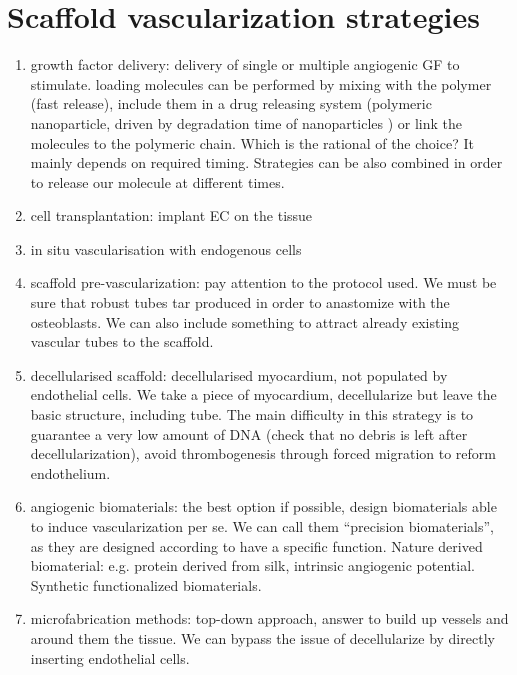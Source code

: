 \section{Scaffold vascularization strategies}
\begin{enumerate}
\item growth factor delivery: delivery of single or multiple angiogenic GF to stimulate. loading molecules can be performed by mixing with the polymer (fast release), include them in a drug releasing system (polymeric nanoparticle, driven by degradation time of nanoparticles ) or link the molecules to the polymeric chain. Which is the rational of the choice? It mainly depends on required timing. Strategies can be also combined in order to release our molecule at different times.
\item cell transplantation: implant EC on the tissue
\item in situ vascularisation with endogenous cells
\item scaffold pre-vascularization: pay attention to the protocol used. We must be sure that robust tubes tar produced in order to anastomize with the osteoblasts. We can also include something to attract already existing vascular tubes to the scaffold.
\item decellularised scaffold: decellularised myocardium, not populated by endothelial cells. We take a piece of myocardium, decellularize but leave the basic structure, including tube. The main difficulty in this strategy is to guarantee a very low amount of DNA (check that no debris is left after decellularization), avoid thrombogenesis through forced migration to reform endothelium.
\item angiogenic biomaterials: the best option if possible, design biomaterials able to induce vascularization per se. We can call them “precision biomaterials”, as they are designed according to have a specific function. Nature derived biomaterial: e.g. protein derived from silk, intrinsic angiogenic potential. Synthetic functionalized biomaterials.
\item microfabrication methods: top-down approach, answer to build up vessels and around them the tissue. We can bypass the issue of decellularize by directly inserting endothelial cells.
\end{enumerate}

